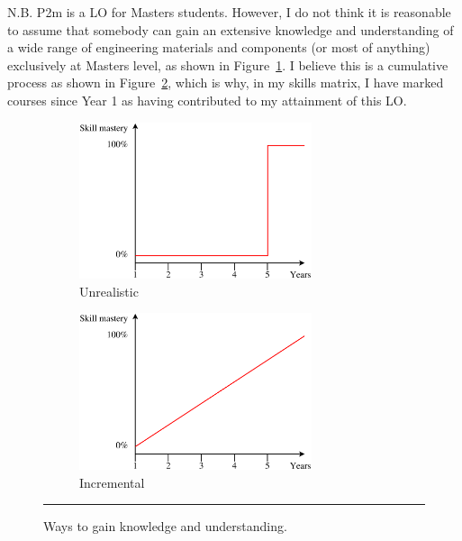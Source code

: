 N.B. P2m is a LO for Masters students.
However, I do not think it is reasonable to assume that somebody can gain an extensive knowledge and understanding of a wide range of engineering materials and components (or most of anything) exclusively at Masters level, as shown in Figure~\ref{fig:learning01}.
I believe this is a cumulative process as shown in Figure~\ref{fig:learning02}, which is why, in my skills matrix, I have marked courses since Year 1 as having contributed to my attainment of this LO.


\begin{figure}[htbp]
	\centering
	\begin{subfigure}{.48\textwidth}
		\centering
		\includegraphics[width=0.75\textwidth]{figures/learning-zigzag.eps}
		\caption{Unrealistic}
		\label{fig:learning01}
	\end{subfigure}
	\begin{subfigure}{.48\textwidth}
		\centering
		\includegraphics[width=0.75\textwidth]{figures/learning-curve.eps}
		\caption{Incremental}
		\label{fig:learning02}
	\end{subfigure}
	\rule{\textwidth}{0.5pt} %
	\caption{Ways to gain knowledge and understanding.}
	\label{fig:learning}
\end{figure}


